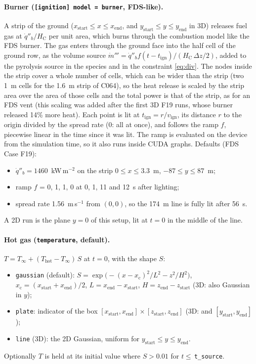 \documentclass[11pt,a4paper]{article}
\newcommand{\code}[1]{\texttt{#1}}
\begin{document}
\paragraph{Burner (\code{[ignition] model = burner}, FDS-like).} A strip of the ground
($x_\text{start}\le x\le x_\text{end}$, and $y_\text{start}\le y\le y_\text{end}$ in 3D) releases fuel gas at
$\dot q''_b/H_\text{C}$ per unit area, which burns through the combustion model like the FDS burner. The gas
enters through the ground face into the half cell of the ground row, as the volume source
$\dot m'''=\dot q''_b f(t-t_\text{ign})/(H_\text{C}\,\Delta z/2)$, added to the pyrolysis source in the species
and in the constraint \eqref{eq:div}. The nodes inside the strip cover a whole number of cells, which can
be wider than the strip (two 1~m cells for the 1.6~m strip of C064), so the heat release is scaled by the
strip area over the area of those cells and the total power is that of the strip, as for an FDS vent (this
scaling was added after the first 3D F19 runs, whose burner released 14\% more heat). Each point is lit at $t_\text{ign}=r/v_\text{ign}$, its distance $r$ to the
origin divided by the spread rate (0: all at once), and follows the ramp $f$, piecewise linear in the
time since it was lit. The ramp is evaluated on the device from the simulation time, so it also runs
inside CUDA graphs. Defaults (FDS Case F19):
\begin{itemize}
  \item $\dot q''_b=1460$~kW\,m$^{-2}$ on the strip $0\le x\le3.3$~m, $-87\le y\le87$~m;
  \item ramp $f$ = 0, 1, 1, 0 at 0, 1, 11 and 12~s after lighting;
  \item spread rate 1.56~m\,s$^{-1}$ from $(0,0)$, so the 174~m line is fully lit after 56~s.
\end{itemize}
A 2D run is the plane $y=0$ of this setup, lit at $t=0$ in the middle of the line.

\paragraph{Hot gas (\code{temperature}, default).} $T=T_\infty+(T_\text{hot}-T_\infty)\,S$ at $t=0$, with
the shape $S$:
\begin{itemize}
  \item \code{gaussian} (default): $S=\exp\!\big(-(x-x_\text{c})^2/L^2 - z^2/H^2\big)$,
        $x_\text{c}=(x_\text{start}+x_\text{end})/2$, $L=x_\text{end}-x_\text{start}$, $H=z_\text{end}-z_\text{start}$ (3D: also Gaussian in $y$);
  \item \code{plate}: indicator of the box $[x_\text{start},x_\text{end}]\times[z_\text{start},z_\text{end}]$ (3D: and $[y_\text{start},y_\text{end}]$);
  \item \code{line} (3D): the 2D Gaussian, uniform for $y_\text{start}\le y\le y_\text{end}$.
\end{itemize}
Optionally $T$ is held at its initial value where $S>0.01$ for $t\le$\,\code{t\_source}.
\end{document}
